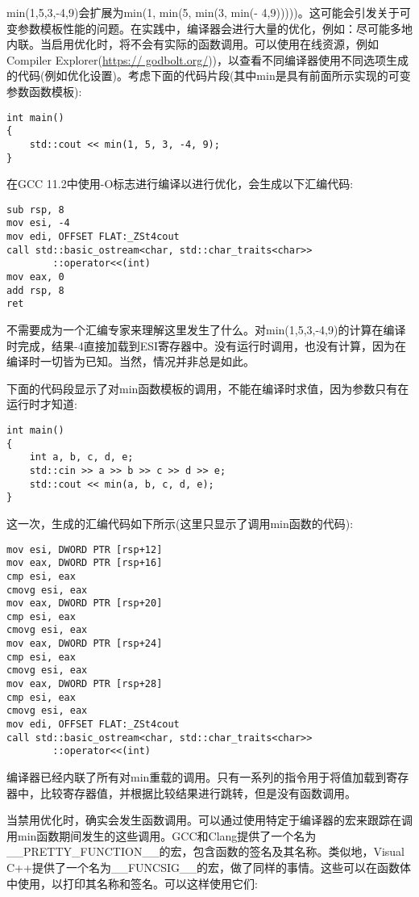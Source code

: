 min(1,5,3,-4,9)会扩展为min(1, min(5, min(3, min(- 4,9)))))。这可能会引发关于可变参数模板性能的问题。在实践中，编译器会进行大量的优化，例如：尽可能多地内联。当启用优化时，将不会有实际的函数调用。可以使用在线资源，例如Compiler Explorer(\url{https:// godbolt.org/}))，以查看不同编译器使用不同选项生成的代码(例如优化设置)。考虑下面的代码片段(其中min是具有前面所示实现的可变参数函数模板):

\begin{lstlisting}[style=styleCXX]
int main()
{
	std::cout << min(1, 5, 3, -4, 9);
}
\end{lstlisting}

在GCC 11.2中使用-O标志进行编译以进行优化，会生成以下汇编代码:

\begin{lstlisting}[style=styleCXX]
sub rsp, 8
mov esi, -4
mov edi, OFFSET FLAT:_ZSt4cout
call std::basic_ostream<char, std::char_traits<char>>
        ::operator<<(int)
mov eax, 0
add rsp, 8
ret
\end{lstlisting}

不需要成为一个汇编专家来理解这里发生了什么。对min(1,5,3,-4,9)的计算在编译时完成，结果-4直接加载到ESI寄存器中。没有运行时调用，也没有计算，因为在编译时一切皆为已知。当然，情况并非总是如此。

下面的代码段显示了对min函数模板的调用，不能在编译时求值，因为参数只有在运行时才知道:

\begin{lstlisting}[style=styleCXX]
int main()
{
	int a, b, c, d, e;
	std::cin >> a >> b >> c >> d >> e;
	std::cout << min(a, b, c, d, e);
}
\end{lstlisting}

这一次，生成的汇编代码如下所示(这里只显示了调用min函数的代码):

\begin{lstlisting}[style=styleCXX]
mov esi, DWORD PTR [rsp+12]
mov eax, DWORD PTR [rsp+16]
cmp esi, eax
cmovg esi, eax
mov eax, DWORD PTR [rsp+20]
cmp esi, eax
cmovg esi, eax
mov eax, DWORD PTR [rsp+24]
cmp esi, eax
cmovg esi, eax
mov eax, DWORD PTR [rsp+28]
cmp esi, eax
cmovg esi, eax
mov edi, OFFSET FLAT:_ZSt4cout
call std::basic_ostream<char, std::char_traits<char>>
        ::operator<<(int)
\end{lstlisting}

编译器已经内联了所有对min重载的调用。只有一系列的指令用于将值加载到寄存器中，比较寄存器值，并根据比较结果进行跳转，但是没有函数调用。

当禁用优化时，确实会发生函数调用。可以通过使用特定于编译器的宏来跟踪在调用min函数期间发生的这些调用。GCC和Clang提供了一个名为\_\_PRETTY\_FUNCTION\_\_的宏，包含函数的签名及其名称。类似地，Visual C++提供了一个名为\_\_FUNCSIG\_\_的宏，做了同样的事情。这些可以在函数体中使用，以打印其名称和签名。可以这样使用它们:


